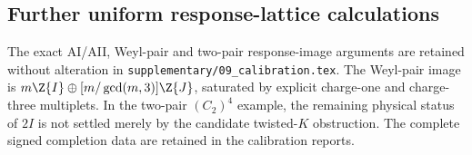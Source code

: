 \subsection{Further uniform response-lattice calculations}\label{root:sec:examples}
The exact AI/AII, Weyl-pair and two-pair response-image arguments are retained without alteration in \texttt{supplementary/09\_calibration.tex}. The Weyl-pair image is $m\Z\{I\}\oplus[m/\gcd(m,3)]\Z\{J\}$, saturated by explicit charge-one and charge-three multiplets. In the two-pair $(C_2)^4$ example, the remaining physical status of $2I$ is not settled merely by the candidate twisted-$K$ obstruction. The complete signed completion data are retained in the calibration reports.
